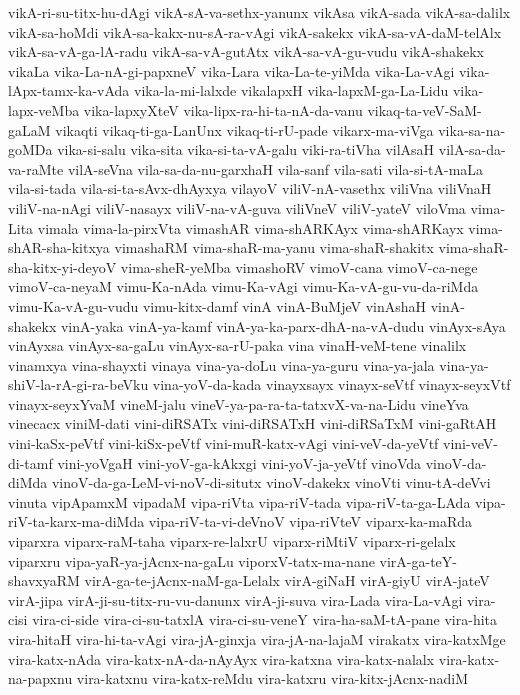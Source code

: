 {vikA-ri-su-titx-hu-dAgi
vikA-sA-va-sethx-yanunx
vikAsa
vikA-sada
vikA-sa-dalilx
vikA-sa-hoMdi
vikA-sa-kakx-nu-sA-ra-vAgi
vikA-sakekx
vikA-sa-vA-daM-telAlx
vikA-sa-vA-ga-lA-radu
vikA-sa-vA-gutAtx
vikA-sa-vA-gu-vudu
vikA-shakekx
vikaLa
vika-La-nA-gi-papxneV
vika-Lara
vika-La-te-yiMda
vika-La-vAgi
vika-lApx-tamx-ka-vAda
vika-la-mi-lalxde
vikalapxH
vika-lapxM-ga-La-Lidu
vika-lapx-veMba
vika-lapxyXteV
vika-lipx-ra-hi-ta-nA-da-vanu
vikaq-ta-veV-SaM-gaLaM
vikaqti
vikaq-ti-ga-LanUnx
vikaq-ti-rU-pade
vikarx-ma-viVga
vika-sa-na-goMDa
vika-si-salu
vika-sita
vika-si-ta-vA-galu
viki-ra-tiVha
vilAsaH
vilA-sa-da-va-raMte
vilA-seVna
vila-sa-da-nu-garxhaH
vila-sanf
vila-sati
vila-si-tA-maLa
vila-si-tada
vila-si-ta-sAvx-dhAyxya
vilayoV
viliV-nA-vasethx
viliVna
viliVnaH
viliV-na-nAgi
viliV-nasayx
viliV-na-vA-guva
viliVneV
viliV-yateV
viloVma
vima-Lita
vimala
vima-la-pirxVta
vimashAR
vima-shARKAyx
vima-shARKayx
vima-shAR-sha-kitxya
vimashaRM
vima-shaR-ma-yanu
vima-shaR-shakitx
vima-shaR-sha-kitx-yi-deyoV
vima-sheR-yeMba
vimashoRV
vimoV-cana
vimoV-ca-nege
vimoV-ca-neyaM
vimu-Ka-nAda
vimu-Ka-vAgi
vimu-Ka-vA-gu-vu-da-riMda
vimu-Ka-vA-gu-vudu
vimu-kitx-damf
vinA
vinA-BuMjeV
vinAshaH
vinA-shakekx
vinA-yaka
vinA-ya-kamf
vinA-ya-ka-parx-dhA-na-vA-dudu
vinAyx-sAya
vinAyxsa
vinAyx-sa-gaLu
vinAyx-sa-rU-paka
vina
vinaH-veM-tene
vinalilx
vinamxya
vina-shayxti
vinaya
vina-ya-doLu
vina-ya-guru
vina-ya-jala
vina-ya-shiV-la-rA-gi-ra-beVku
vina-yoV-da-kada
vinayxsayx
vinayx-seVtf
vinayx-seyxVtf
vinayx-seyxYvaM
vineM-jalu
vineV-ya-pa-ra-ta-tatxvX-va-na-Lidu
vineYva
vinecacx
viniM-dati
vini-diRSATx
vini-diRSATxH
vini-diRSaTxM
vini-gaRtAH
vini-kaSx-peVtf
vini-kiSx-peVtf
vini-muR-katx-vAgi
vini-veV-da-yeVtf
vini-veV-di-tamf
vini-yoVgaH
vini-yoV-ga-kAkxgi
vini-yoV-ja-yeVtf
vinoVda
vinoV-da-diMda
vinoV-da-ga-LeM-vi-noV-di-situtx
vinoV-dakekx
vinoVti
vinu-tA-deVvi
vinuta
vipApamxM
vipadaM
vipa-riVta
vipa-riV-tada
vipa-riV-ta-ga-LAda
vipa-riV-ta-karx-ma-diMda
vipa-riV-ta-vi-deVnoV
vipa-riVteV
viparx-ka-maRda
viparxra
viparx-raM-taha
viparx-re-lalxrU
viparx-riMtiV
viparx-ri-gelalx
viparxru
vipa-yaR-ya-jAcnx-na-gaLu
viporxV-tatx-ma-nane
virA-ga-teY-shavxyaRM
virA-ga-te-jAcnx-naM-ga-Lelalx
virA-giNaH
virA-giyU
virA-jateV
virA-jipa
virA-ji-su-titx-ru-vu-danunx
virA-ji-suva
vira-Lada
vira-La-vAgi
vira-cisi
vira-ci-side
vira-ci-su-tatxlA
vira-ci-su-veneY
vira-ha-saM-tA-pane
vira-hita
vira-hitaH
vira-hi-ta-vAgi
vira-jA-ginxja
vira-jA-na-lajaM
virakatx
vira-katxMge
vira-katx-nAda
vira-katx-nA-da-nAyAyx
vira-katxna
vira-katx-nalalx
vira-katx-na-papxnu
vira-katxnu
vira-katx-reMdu
vira-katxru
vira-kitx-jAcnx-nadiM
}
